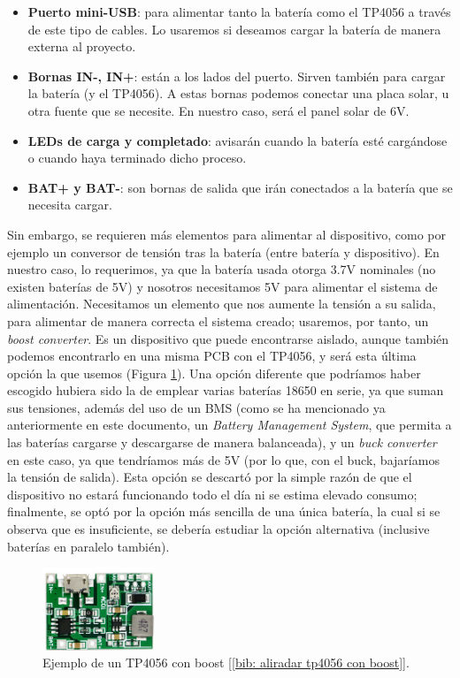 \documentclass[12pt]{article}
\begin{document}
	\begin{itemize}
		\item \textbf{Puerto mini-USB}: para alimentar tanto la batería como el TP4056 a través de este tipo de cables. Lo usaremos si deseamos cargar la batería de manera externa al proyecto.
		\item \textbf{Bornas IN-, IN+}: están a los lados del puerto. Sirven también para cargar la batería (y el TP4056). A estas bornas podemos conectar una placa solar, u otra fuente que se necesite. En nuestro caso, será el panel solar de 6V.
		\item \textbf{LEDs de carga y completado}: avisarán cuando la batería esté cargándose o cuando haya terminado dicho proceso.
		\item \textbf{BAT+ y BAT-}: son bornas de salida que irán conectados a la batería que se necesita cargar.
	\end{itemize}

	\noindent Sin embargo, se requieren más elementos para alimentar al dispositivo, como por ejemplo un conversor de tensión tras la batería (entre batería y dispositivo). En nuestro caso, lo requerimos, ya que la batería usada otorga 3.7V nominales (no existen baterías de 5V) y nosotros necesitamos 5V para alimentar el sistema de alimentación. Necesitamos un elemento que nos aumente la tensión a su salida, para alimentar de manera correcta el sistema creado; usaremos, por tanto, un \textit{boost converter}. Es un dispositivo que puede encontrarse aislado, aunque también podemos encontrarlo en una misma PCB con el TP4056, y será esta última opción la que usemos (Figura \ref{TP4056 con boost}). Una opción diferente que podríamos haber escogido hubiera sido la de emplear varias baterías 18650 en serie, ya que suman sus tensiones, además del uso de un BMS (como se ha mencionado ya anteriormente en este documento, un \textit{Battery Management System}, que permita a las baterías cargarse y descargarse de manera balanceada), y un \textit{buck converter} en este caso, ya que tendríamos más de 5V (por lo que, con el buck, bajaríamos la tensión de salida). Esta opción se descartó por la simple razón de que el dispositivo no estará funcionando todo el día ni se estima elevado consumo; finalmente, se optó por la opción más sencilla de una única batería, la cual si se observa que es insuficiente, se debería estudiar la opción alternativa (inclusive baterías en paralelo también).  \\
	
	\begin{figure}[h]
		\begin{center}
			\includegraphics[width=0.3\textwidth]{img/tp4056_withBoost.png}
			\caption{Ejemplo de un TP4056 con boost [\ref{bib: aliradar tp4056 con boost}].}
			\label{TP4056 con boost}
		\end{center}
	\end{figure}
	
\end{document}
